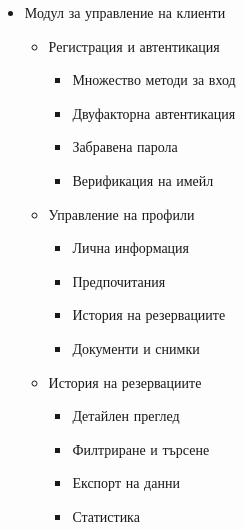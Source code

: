 \documentclass[12pt,a4paper]{article}
\begin{document}
\begin{itemize}
    \item Модул за управление на клиенти
    \begin{itemize}
        \item Регистрация и автентикация
        \begin{itemize}
            \item Множество методи за вход
            \item Двуфакторна автентикация
            \item Забравена парола
            \item Верификация на имейл
        \end{itemize}
        \item Управление на профили
        \begin{itemize}
            \item Лична информация
            \item Предпочитания
            \item История на резервациите
            \item Документи и снимки
        \end{itemize}
        \item История на резервациите
        \begin{itemize}
            \item Детайлен преглед
            \item Филтриране и търсене
            \item Експорт на данни
            \item Статистика
        \end{itemize}
    \end{itemize}
    

\end{itemize}
\end{document}
